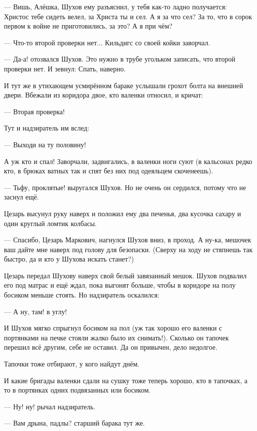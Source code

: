--- Вишь, Алёшка, \dash Шухов ему разъяснил, \Dash у тебя как-то ладно получается: Христос тебе сидеть
велел, за Христа ты и сел. А я за что сел? За то, что в сорок первом к войне не приготовились, за
это? А я при чём?

--- Что-то второй проверки нет... \dash Кильдигс со своей койки заворчал.

--- Да-а! \dash отозвался Шухов. \Dash Это нужно в трубе угольком записать, что второй проверки нет. \dash
И зевнул: \Dash Спать, наверно.

И тут же в утихающем усмирённом бараке услышали грохот болта на внешней двери. Вбежали из
коридора двое, кто валенки относил, и кричат:

--- Вторая проверка!

Тут и надзиратель им вслед:

--- Выходи на ту половину!

А уж кто и спал! Заворчали, задвигались, в валенки ноги суют (в кальсонах редко кто, в брюках
ватных так и спят \dash без них под одеяльцем скоченеешь).

--- Тьфу, проклятые! \dash выругался Шухов. Но не очень он сердился, потому что не заснул ещё.

Цезарь высунул руку наверх и положил ему два печенья, два кусочка сахару и один круглый
ломтик колбасы.

--- Спасибо, Цезарь Маркович, \dash нагнулся Шухов вниз, в проход. \Dash А ну-ка, мешочек ваш дайте мне
наверх под голову для безопаски. \dash (Сверху на ходу не стяпнешь так быстро, да и кто у Шухова
искать станет?)

Цезарь передал Шухову наверх свой белый завязанный мешок. Шухов подвалил его под матрас и
ещё ждал, пока выгонят больше, чтобы в коридоре на полу босиком меньше стоять. Но надзиратель
оскалился:

--- А ну, там! в углу!

И Шухов мягко спрыгнул босиком на пол (уж так хорошо его валенки с портянками на печке стояли
\dash жалко было их снимать!). Сколько он тапочек перешил \dash всё другим, себе не оставил. Да он
привычен, дело недолгое.

Тапочки тоже отбирают, у кого найдут днём.

И какие бригады валенки сдали на сушку \dash тоже теперь хорошо, кто в тапочках, а то в портянках
одних подвязанных или босиком.

--- Ну! ну! \dash рычал надзиратель.

--- Вам дрына, падлы? \dash старший барака тут же.

